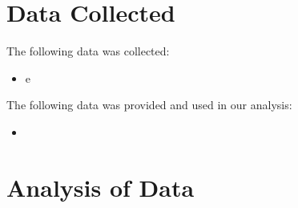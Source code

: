 \documentclass{article}
\begin{document}
\section{Data Collected}

The following data was collected:

\begin{itemize}
    \item e
\end{itemize}

The following data was provided and used in our analysis:

\begin{itemize}
    \item 
\end{itemize}

\section{Analysis of Data}
\end{document}
